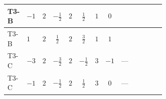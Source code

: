\documentclass[8pt]{article}
\begin{document}
\begin{landscape}
\begin{longtable}{@{}llcccccc >{\raggedright\arraybackslash}p{0.21\linewidth} >{\raggedright\arraybackslash}p{0.21\linewidth} >{\raggedright\arraybackslash}p{0.21\linewidth}@{}}
\midrule
T3-B & $-1$ & $2$ & $-\frac{1}{2}$ & $2$ & $\frac{1}{2}$ & $1$ & $0$ & \scriptsize\adjustbox{max width=\linewidth}{$\begin{gathered} {\lambda_{12}^{(A)}} (2 T_{\nu}^{(1)}+2 T_{\nu}^{(2)})\end{gathered}$} & \scriptsize\adjustbox{max width=\linewidth}{$\begin{gathered} -\frac{8}{3} \operatorname{Tr}\!\left({y_1}\,\left({y_1}\right)^{\dagger}\,{y_2}\,\left({y_2}\right)^{\dagger}\right)\end{gathered}$} & \scriptsize\adjustbox{max width=\linewidth}{$\begin{gathered} +\frac{4}{3} {\lambda_5} \left({\lambda_5}\right)^{*}\end{gathered}$} \\
\midrule
T3-B & $1$ & $2$ & $\frac{1}{2}$ & $2$ & $\frac{3}{2}$ & $1$ & $1$ & \scriptsize\adjustbox{max width=\linewidth}{$\begin{gathered} {\lambda_{12}^{(A)}} (2 T_{\nu}^{(1)}+2 T_{\nu}^{(2)})\end{gathered}$} & \scriptsize\adjustbox{max width=\linewidth}{$\begin{gathered} -\frac{8}{3} \operatorname{Tr}\!\left({y_1}\,\left({y_1}\right)^{\dagger}\,{y_2}\,\left({y_2}\right)^{\dagger}\right)\end{gathered}$} & \scriptsize\adjustbox{max width=\linewidth}{$\begin{gathered} +\frac{4}{3} {\lambda_5} \left({\lambda_5}\right)^{*}\end{gathered}$} \\
\midrule
T3-C & $-3$ & $2$ & $-\frac{3}{2}$ & $2$ & $-\frac{1}{2}$ & $3$ & $-1$ & --- & \scriptsize\adjustbox{max width=\linewidth}{$\begin{gathered} -\frac{2}{3} \operatorname{Tr}\!\left({y_1}\,\left({y_1}\right)^{\dagger}\,{y_2}\,\left({y_2}\right)^{\dagger}\right)\end{gathered}$} & \scriptsize\adjustbox{max width=\linewidth}{$\begin{gathered} +\frac{4}{3} {\lambda_5} \left({\lambda_5}\right)^{*}\end{gathered}$} \\
\midrule
T3-C & $-1$ & $2$ & $-\frac{1}{2}$ & $2$ & $\frac{1}{2}$ & $3$ & $0$ & --- & \scriptsize\adjustbox{max width=\linewidth}{$\begin{gathered} -\frac{2}{3} \operatorname{Tr}\!\left({y_1}\,\left({y_1}\right)^{\dagger}\,{y_2}\,\left({y_2}\right)^{\dagger}\right)\end{gathered}$} & \scriptsize\adjustbox{max width=\linewidth}{$\begin{gathered} +\frac{4}{3} {\lambda_5} \left({\lambda_5}\right)^{*}\end{gathered}$} \\

\end{longtable}
\end{landscape}
\end{document}
